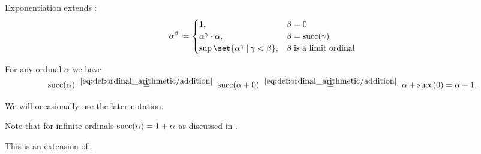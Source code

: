 \begin{definition}
\begin{thmenum}
     Exponentiation extends :
    \begin{equation}\label{eq:def:ordinal_arithmetic/exponentiation}
      \alpha^\beta \coloneqq \begin{cases}
        1,                                               &\beta = 0 \\
        \alpha^\gamma \cdot \alpha,                      &\beta = \op{succ}(\gamma) \\
        \sup\set{ \alpha^\gamma \given \gamma < \beta }, &\beta \T{is a limit ordinal} \\
      \end{cases}
    \end{equation}
  \end{thmenum}
\end{definition}

\begin{remark}\label{rem:ordinal_successor_via_addition}
  For any ordinal \( \alpha \) we have
  \begin{equation*}
    \op{succ}(\alpha)
    \reloset {\ref{eq:def:ordinal_arithmetic/addition}} =
    \op{succ}(\alpha + 0)
    \reloset {\ref{eq:def:ordinal_arithmetic/addition}} =
    \alpha + \op{succ}(0)
    =
    \alpha + 1.
  \end{equation*}

  We will occasionally use the later notation.

  Note that for infinite ordinals \( \operatorname{succ}(\alpha) = 1 + \alpha \) as discussed in .

  This is an extension of .
\end{remark}

